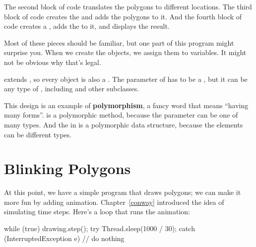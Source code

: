 The second block of code translates the polygons to different locations.
The third block of code creates the  and adds the polygons to it.
And the fourth block of code creates a , adds the  to it, and displays the result.

Most of these pieces should be familiar, but one part of this program might surprise you.
When we create the  objects, we assign them to  variables.
It might not be obvious why that's legal.


 extends , so every  object is also a .
The parameter of  has to be a , but it can be any type of , including  and other subclasses.


This design is an example of {\bf polymorphism}, a fancy word that means ``having many forms''.
 is a polymorphic method, because the parameter can be one of many types.
And the  in  is a polymorphic data structure, because the elements can be different types.




\section{Blinking Polygons}

At this point, we have a simple program that draws polygons; we can make it more fun by adding animation.
Chapter~\ref{conway} introduced the idea of simulating time steps.
Here's a loop that runs the animation:

\begin{code}
while (true) {
    drawing.step();
    try {
        Thread.sleep(1000 / 30);
    } catch (InterruptedException e) {
        // do nothing
    }
}
\end{code}


